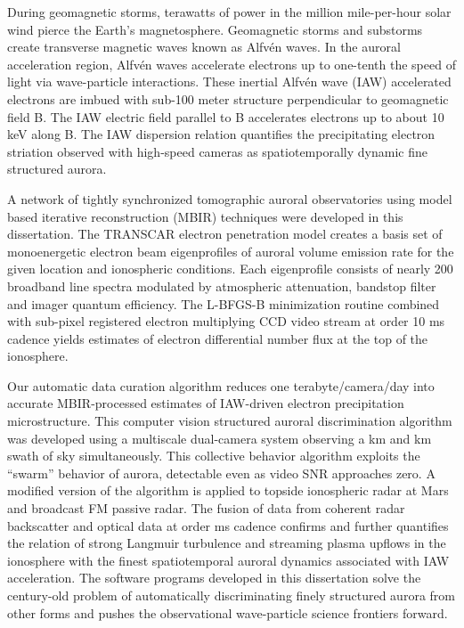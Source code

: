 During geomagnetic storms, terawatts of power in the million mile-per-hour solar wind pierce the Earth’s magnetosphere. Geomagnetic storms and substorms create transverse magnetic waves known as Alfvén waves. 
In the auroral acceleration region, Alfvén waves accelerate electrons up to one-tenth the speed of light via wave-particle interactions. 
These inertial Alfvén wave (IAW) accelerated electrons are imbued with sub-100 meter structure perpendicular to geomagnetic field B. The IAW electric field parallel to B accelerates electrons up to about 10 keV along B. 
The IAW dispersion relation quantifies the precipitating electron striation observed with high-speed cameras as spatiotemporally dynamic fine structured aurora.

A network of tightly synchronized tomographic auroral observatories using model based iterative reconstruction (MBIR) techniques were developed in this dissertation. 
The TRANSCAR electron penetration model creates a basis set of monoenergetic electron beam eigenprofiles of auroral volume emission rate for the given location and ionospheric conditions. 
Each eigenprofile consists of nearly 200 broadband line spectra modulated by atmospheric attenuation, bandstop filter and imager quantum efficiency. 
The L-BFGS-B minimization routine combined with sub-pixel registered electron multiplying CCD video stream at order 10 ms cadence yields estimates of electron differential number flux at the top of the ionosphere. 

Our automatic data curation algorithm reduces one terabyte/camera/day into accurate MBIR-processed estimates of IAW-driven electron precipitation microstructure. 
This computer vision structured auroral discrimination algorithm was developed using a multiscale dual-camera system observing a \unit[175]{km} and \unit[14]{km} swath of sky simultaneously. 
This collective behavior algorithm exploits the “swarm” behavior of aurora, detectable even as video SNR approaches zero. 
A modified version of the algorithm is applied to topside ionospheric radar at Mars and broadcast FM passive radar. 
The fusion of data from coherent radar backscatter and optical data at order \unit[10]{ms} cadence confirms and further quantifies the relation of strong Langmuir turbulence and streaming plasma upflows in the ionosphere with the finest spatiotemporal auroral dynamics associated with IAW acceleration. 
The software programs developed in this dissertation solve the century-old problem of automatically discriminating finely structured aurora from other forms and pushes the observational wave-particle science frontiers forward.

